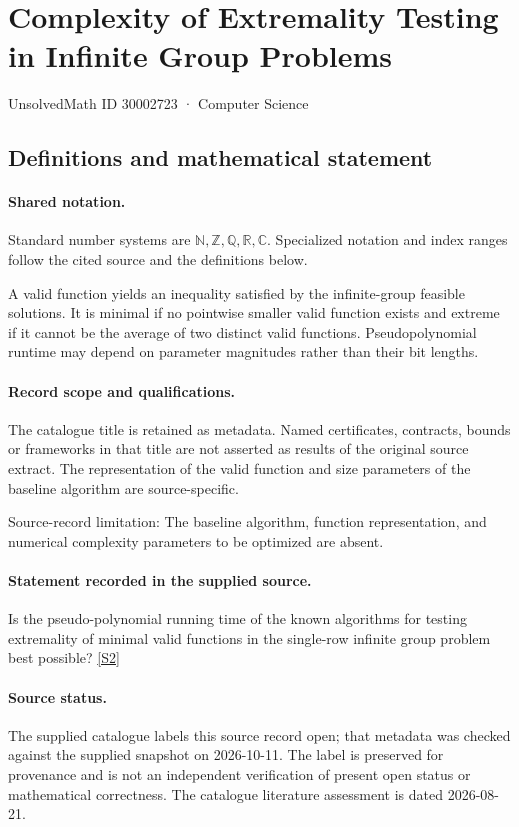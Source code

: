\documentclass[11pt]{article}
\newcommand{\sref}[2]{\hyperlink{source:#1:#2}{[S#2]}}
\begin{document}
\setcounter{section}{30002722}
\section{Complexity of Extremality Testing in Infinite Group Problems}\label{30002723}
{\small\sffamily UnsolvedMath ID 30002723 · Computer Science}
\subsection{Definitions and mathematical statement}

\paragraph{Shared notation.}Standard number systems are $\mathbb N,\mathbb Z,\mathbb Q,\mathbb R,\mathbb C$. Specialized notation and index ranges follow the cited source and the definitions below.


A valid function yields an inequality satisfied by the infinite-group feasible solutions. It is minimal if no pointwise smaller valid function exists and extreme if it cannot be the average of two distinct valid functions. Pseudopolynomial runtime may depend on parameter magnitudes rather than their bit lengths.
\paragraph{Record scope and qualifications.}
The catalogue title is retained as metadata. Named certificates, contracts, bounds or frameworks in that title are not asserted as results of the original source extract.
The representation of the valid function and size parameters of the baseline algorithm are source-specific.

Source-record limitation: The baseline algorithm, function representation, and numerical complexity parameters to be optimized are absent.
\paragraph{Statement recorded in the supplied source.}
Is the pseudo-polynomial running time of the known algorithms for testing extremality of minimal valid functions in the single-row infinite group problem best possible? \sref{30002723}{2}
\paragraph{Source status.}
The supplied catalogue labels this source record open; that metadata was checked against the supplied snapshot on 2026-10-11. The label is preserved for provenance and is not an independent verification of present open status or mathematical correctness. The catalogue literature assessment is dated 2026-08-21.
\end{document}
